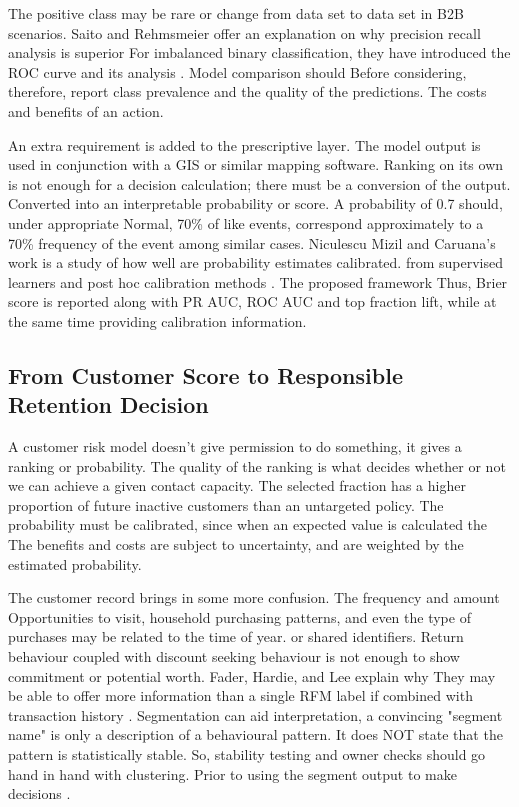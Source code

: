 \documentclass[a4paper,11pt,oneside]{book}
\theoremstyle{plain}
\theoremstyle{definition}
\theoremstyle{remark}
\begin{document}
The positive class may be rare or change from data set to data set in B2B scenarios. Saito and Rehmsmeier offer an explanation on why precision recall analysis is superior For imbalanced binary classification, they have introduced the ROC curve and its analysis \cite{saito2015pr}. Model comparison should Before considering, therefore, report class prevalence and the quality of the predictions. The costs and benefits of an action.

An extra requirement is added to the prescriptive layer. The model output is used in conjunction with a GIS or similar mapping software. Ranking on its own is not enough for a decision calculation; there must be a conversion of the output. Converted into an interpretable probability or score. A probability of 0.7 should, under appropriate Normal, 70\% of like events, correspond approximately to a 70\% frequency of the event among similar cases. Niculescu Mizil and Caruana's work is a study of how well are probability estimates calibrated. from supervised learners and post hoc calibration methods \cite{niculescu2005calibration}. The proposed framework Thus, Brier score is reported along with PR AUC, ROC AUC and top fraction lift, while at the same time providing calibration information.

\subsection{From Customer Score to Responsible Retention Decision}

A customer risk model doesn't give permission to do something, it gives a ranking or probability. The quality of the ranking is what decides whether or not we can achieve a given contact capacity. The selected fraction has a higher proportion of future inactive customers than an untargeted policy. The probability must be calibrated, since when an expected value is calculated the The benefits and costs are subject to uncertainty, and are weighted by the estimated probability.

The customer record brings in some more confusion. The frequency and amount Opportunities to visit, household purchasing patterns, and even the type of purchases may be related to the time of year. or shared identifiers. Return behaviour coupled with discount seeking behaviour is not enough to show commitment or potential worth. Fader, Hardie, and Lee explain why They may be able to offer more information than a single RFM label if combined with transaction history \cite{fader2005rfm}. Segmentation can aid interpretation, a convincing "segment name" is only a description of a behavioural pattern. It does NOT state that the pattern is statistically stable. So, stability testing and owner checks should go hand in hand with clustering. Prior to using the segment output to make decisions \cite{rousseeuw1987silhouettes}.
\end{document}
